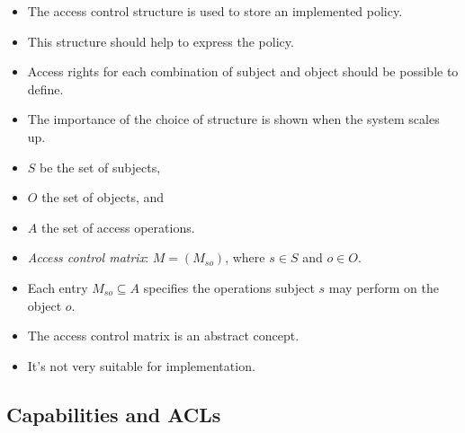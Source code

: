 \begin{frame}
  \begin{itemize}
    \item The access control structure is used to store an implemented policy.

    \item This structure should help to express the policy.

    \item Access rights for each combination of subject and object should be 
      possible to define.

    \item The importance of the choice of structure is shown when the system 
      scales up.

  \end{itemize}
\end{frame}

\begin{frame}
  \begin{definition}
    \begin{itemize}
      \item \(S\) be the set of subjects,
      \item \(O\) the set of objects, and
      \item \(A\) the set of access operations.

        \pause{}

      \item \emph{Access control matrix}: \( M = \left( M_{so} \right)\), where 
        \(s\in S\) and \(o\in O\).
      \item Each entry \(M_{so}\subseteq A\) specifies the operations subject 
        \(s\) may perform on the object \(o\).
    \end{itemize}
  \end{definition}
\end{frame}

\begin{frame}
  \begin{remark}
    \begin{itemize}
      \item The access control matrix is an abstract concept.
      \item It's not very suitable for implementation.
    \end{itemize}
  \end{remark}
\end{frame}

\subsection{Capabilities and ACLs}

